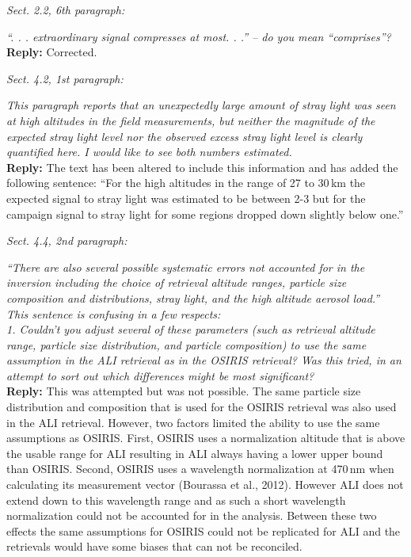 \documentclass[12pt, notitlepage]{article}
\begin{document}
\textit{Sect. 2.2, 6th paragraph:}

\textit{``. . . extraordinary signal compresses at most. . .'' – do you mean ``comprises''?}\\

\textbf{Reply:} Corrected.

\hrulefill

\textit{Sect. 4.2, 1st paragraph:}

\textit{This paragraph reports that an unexpectedly large amount of stray light was seen at
high altitudes in the field measurements, but neither the magnitude of the expected
stray light level nor the observed excess stray light level is clearly quantified here. I
would like to see both numbers estimated.}\\

\textbf{Reply:} The text has been altered to include this information and has added the following sentence: ``For the high altitudes in the range of 27 to 30\,km the expected signal to stray light was estimated to be between 2-3 but for the campaign signal to stray light for some regions dropped down slightly below one.''

\hrulefill

\textit{Sect. 4.4, 2nd paragraph:}

\textit{``There are also several possible systematic errors not accounted for in the inversion
including the choice of retrieval altitude ranges, particle size composition and distributions,
stray light, and the high altitude aerosol load.''}\\

\textit{This sentence is confusing in a few respects:}\\

\textit{1. Couldn't you adjust several of these parameters (such as retrieval altitude range,
particle size distribution, and particle composition) to use the same assumption in the
ALI retrieval as in the OSIRIS retrieval? Was this tried, in an attempt to sort out which
differences might be most significant?}\\

\textbf{Reply:} This was attempted but was not possible. The same particle size distribution and composition
that is used for the OSIRIS retrieval was also used in the ALI retrieval.  However, two factors limited the ability to use the same assumptions as OSIRIS. First, OSIRIS uses a normalization altitude that is above the usable range for ALI resulting in ALI always having a lower upper bound than OSIRIS. Second, OSIRIS uses a wavelength normalization at 470\,nm when calculating its measurement vector (Bourassa et al., 2012). However ALI does not extend down to this wavelength range and as such a short wavelength normalization could not be accounted for in the analysis. Between these two effects the same assumptions for OSIRIS could not be replicated for ALI and the retrievals would have some biases that can not be reconciled.\\
\end{document}
